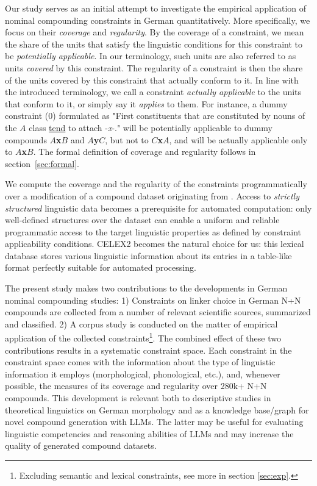 \documentclass[10pt, a4paper]{article}
\begin{document}
Our study serves as an initial attempt to investigate the empirical application of nominal compounding constraints in German quantitatively. More specifically, we focus on their \textit{coverage} and \textit{regularity}. By the coverage of a constraint, we mean the share of the units that satisfy the linguistic conditions for this constraint to be \textit{potentially applicable}. In our terminology, such units are also referred to as units \textit{covered} by this constraint. The regularity of a constraint is then the share of the units covered by this constraint that actually conform to it. In line with the introduced terminology, we call a constraint \textit{actually applicable} to the units that conform to it, or simply say it \textit{applies} to them. For instance, a dummy constraint (0) formulated as "First constituents that are constituted by nouns of the $A$ class \underline{tend} to attach \mbox{-\textit{x}-}." will be potentially applicable to dummy compounds $A$\textbf{x}$B$ and $A$\textbf{y}$C$, but not to $C$\textbf{x}$A$, and will be actually applicable only to $A$\textbf{x}$B$. The formal definition of coverage and regularity follows in section~\ref{sec:formal}.


We compute the coverage and the regularity of the constraints programmatically over a modification of a compound dataset originating from . Access to \textit{strictly structured} linguistic data becomes a prerequisite for automated computation: only well-defined structures over the dataset can enable a uniform and reliable programmatic access to the target linguistic properties as defined by constraint applicability conditions. CELEX2  becomes the natural choice for us: this lexical database stores various linguistic information about its entries in a table-like format perfectly suitable for automated processing.

The present study makes two contributions to the developments in German nominal compounding studies: 1) Constraints on linker choice in German N+N compounds are collected from a number of relevant scientific sources, summarized and classified. 2) A corpus study is conducted on the matter of empirical application of the collected constraints\footnote{Excluding semantic and lexical constraints, see more in section \ref{sec:exp}.}. The combined effect of these two contributions results in a systematic constraint space. Each constraint in the constraint space comes with the information about the type of linguistic information it employs (morphological, phonological, etc.), and, whenever possible, the measures of its coverage and regularity over 280k+ N+N compounds. This development is relevant both to descriptive studies in theoretical linguistics on German morphology and as a knowledge base/graph for novel compound generation with LLMs. The latter may be useful for evaluating linguistic competencies and reasoning abilities of LLMs and may increase the quality of generated compound datasets.
\end{document}
